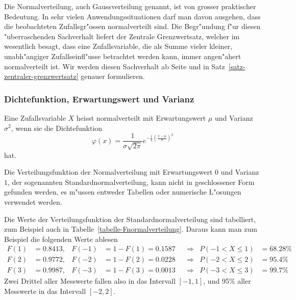 Die Normalverteilung, auch Gaussverteilung genannt, ist von grosser praktischer
Bedeutung.
In sehr vielen Anwendungssituationen darf man davon ausgehen,
dass die beobachteten Zufallsgr"ossen normalverteilt sind.
Die Begr"undung
f"ur diesen "uberraschenden Sachverhalt liefert der Zentrale Grenzwertsatz,
welcher im wesentlich besagt, dass eine Zufallsvariable, die als Summe vieler
kleiner, unabh"angiger Zufallseinfl"usse betrachtet werden kann, immer
angen"ahert normalverteilt ist.
Wir werden diesen Sachverhalt ab Seite \pageref{zentraler-grenzwertsatz}
und in Satz~\ref{satz-zentraler-grenzwertsatz} genauer formulieren.

\subsubsection{Dichtefunktion, Erwartungswert und Varianz}
\begin{definition}
Eine Zufallsvariable $X$ heisst normalverteilt mit Erwartungswert $\mu$ und
Varianz $\sigma^2$, wenn sie die
Dichtefunktion
\[
\varphi(x)=\frac1{\sigma\sqrt{2\pi}}e^{-\frac{1}{2}
\left(\frac{x-\mu}{\sigma}\right)^2}
\]
hat.
\end{definition}
%
%
Die Verteilungsfunktion der Normalverteilung mit Erwartungswert $0$
und Varianz $1$, der sogenannten Standardnormalverteilung, kann nicht in
geschlossener Form gefunden werden, es m"ussen entweder Tabellen
oder numerische L"osungen verwendet werden.

Die Werte der Verteilungsfunktion der Standardnormalverteilung sind 
tabelliert, zum Beispiel auch in Tabelle~\ref{tabelle-Fnormalverteilung}.
Daraus kann man zum Beispiel die folgenden Werte ablesen
\begin{align*}
F(1)&=0.8413,&F(-1)&=1-F(1)=0.1587&&\Rightarrow&P(-1<X\le 1)&=68.28\%\\
F(2)&=0.9772,&F(-2)&=1-F(2)=0.0228&&\Rightarrow&P(-2<X\le 2)&=95.4\%\\
F(3)&=0.9987,&F(-3)&=1-F(3)=0.0013&&\Rightarrow&P(-3<X\le 3)&=99.7\%
\end{align*}
Zwei Drittel aller Messwerte fallen also in das Intervall $[-1,1]$, und 95\%
aller Messwerte in das Intervall $[-2,2]$.

